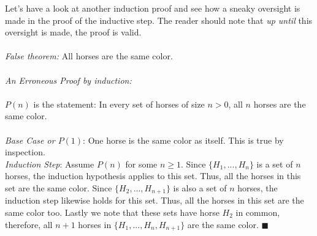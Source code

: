 \noindent Let's have a look at another induction proof and  see how a sneaky oversight is made in the proof of the inductive step. The reader should note that \textit{up until} this oversight is made, the proof is valid. \\ \\
\noindent \textit{False theorem:} All horses are the same color.\\ \\
\textit{An Erroneous Proof by induction:}\\ \\
$P(n)$ is the statement: In every set of horses of size $n>0$, all $n$ horses are the same color.\\ \\
\textit{Base Case or $P(1)$}: One horse is the same color as itself. This is true by inspection. \\
\textit{Induction Step}: Assume $P(n)$ for some $n\geq 1$. Since $\{H_1,...,H_n\}$ is a set of $n$ horses, the induction hypothesis applies to this set. Thus, all the horses in this set are the same color.
Since $\{ H_2,...,H_{n+1}\}$ is also a set of $n$ horses, the induction step likewise holds for this set. Thus, all the horses in this set are the same color too. Lastly we note that these sets have horse $H_2$ in common, therefore, all $n+1$ horses in $\{H_1,...,H_n,H_{n+1}\}$ are the same color. $\blacksquare$


